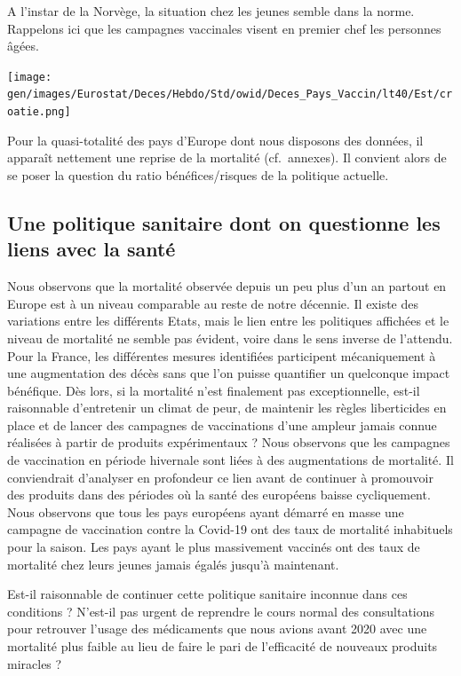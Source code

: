 \documentclass[
]{article}
\begin{document}
A l'instar de la Norvège, la situation chez les jeunes semble dans la
norme. Rappelons ici que les campagnes vaccinales visent en premier chef
les personnes âgées.

\texttt{[image: gen/images/Eurostat/Deces/Hebdo/Std/owid/Deces\_Pays\_Vaccin/lt40/Est/croatie.png]}

Pour la quasi-totalité des pays d'Europe dont nous disposons des
données, il apparaît nettement une reprise de la mortalité
(cf.~annexes). Il convient alors de se poser la question du ratio
bénéfices/risques de la politique actuelle.

\hypertarget{une-politique-sanitaire-dont-on-questionne-les-liens-avec-la-santuxe9}{%
\subsection{Une politique sanitaire dont on questionne les liens avec la
santé}\label{une-politique-sanitaire-dont-on-questionne-les-liens-avec-la-santuxe9}}

Nous observons que la mortalité observée depuis un peu plus d'un an
partout en Europe est à un niveau comparable au reste de notre décennie.
Il existe des variations entre les différents Etats, mais le lien entre
les politiques affichées et le niveau de mortalité ne semble pas
évident, voire dans le sens inverse de l'attendu. Pour la France, les
différentes mesures identifiées participent mécaniquement à une
augmentation des décès sans que l'on puisse quantifier un quelconque
impact bénéfique. Dès lors, si la mortalité n'est finalement pas
exceptionnelle, est-il raisonnable d'entretenir un climat de peur, de
maintenir les règles liberticides en place et de lancer des campagnes de
vaccinations d'une ampleur jamais connue réalisées à partir de produits
expérimentaux ? Nous observons que les campagnes de vaccination en
période hivernale sont liées à des augmentations de mortalité. Il
conviendrait d'analyser en profondeur ce lien avant de continuer à
promouvoir des produits dans des périodes où la santé des européens
baisse cycliquement. Nous observons que tous les pays européens ayant
démarré en masse une campagne de vaccination contre la Covid-19 ont des
taux de mortalité inhabituels pour la saison. Les pays ayant le plus
massivement vaccinés ont des taux de mortalité chez leurs jeunes jamais
égalés jusqu'à maintenant.

Est-il raisonnable de continuer cette politique sanitaire inconnue dans
ces conditions ? N'est-il pas urgent de reprendre le cours normal des
consultations pour retrouver l'usage des médicaments que nous avions
avant 2020 avec une mortalité plus faible au lieu de faire le pari de
l'efficacité de nouveaux produits miracles ?
\end{document}
